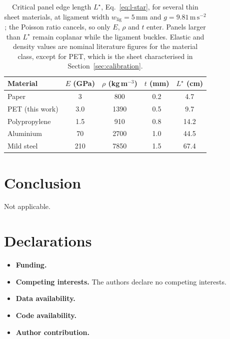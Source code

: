 \documentclass[pdflatex,sn-mathphys-num]{sn-jnl}%
\theoremstyle{thmstyleone}%
\theoremstyle{thmstyletwo}%
\theoremstyle{thmstylethree}%
\newcommand{\wlig}{w_{\mathrm{lig}}}
\begin{document}
\begin{table}[h!]
\centering
\begin{tabular}{lcccc}
\toprule
\textbf{Material} & $E$ (GPa) & $\rho$ (kg\,m$^{-3}$) & $t$ (mm) & $L^{\star}$ (cm) \\
\midrule
Paper           & 3   & 800  & 0.2 & 4.7 \\
PET (this work) & 3.0 & 1390 & 0.5 & 9.7 \\
Polypropylene   & 1.5 & 910  & 0.8 & 14.2 \\
Aluminium       & 70  & 2700 & 1.0 & 44.5 \\
Mild steel      & 210 & 7850 & 1.5 & 67.4 \\
\bottomrule
\end{tabular}
\caption{Critical panel edge length $L^{\star}$, Eq.~\eqref{eq:l-star}, for
several thin sheet materials, at ligament width $\wlig=5\,\mathrm{mm}$ and
$g=9.81\,\mathrm{m\,s^{-2}}$; the Poisson ratio cancels, so only $E$, $\rho$ and
$t$ enter. Panels larger than $L^{\star}$ remain coplanar while the ligament
buckles. Elastic and density values are nominal literature figures for the
material class, except for PET, which is the sheet characterised in
Section~\ref{sec:calibration}.}
\label{tab:critical-length}
\end{table}

\section{Conclusion}\label{sec:conclusion}


\backmatter


Not applicable.



\section*{Declarations}

\begin{itemize}
\item \textbf{Funding.} %
\item \textbf{Competing interests.} The authors declare no competing interests.
\item \textbf{Data availability.} %
\item \textbf{Code availability.} %
\item \textbf{Author contribution.} %
\end{itemize}
\end{document}
